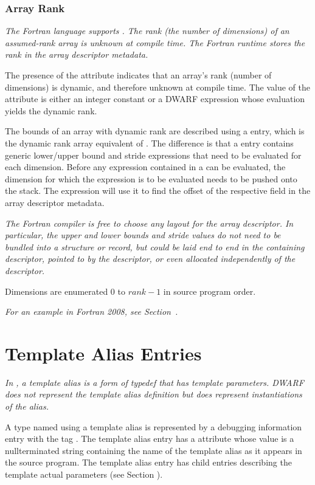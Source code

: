 \subsubsection{Array Rank}
\label{chap:DWATrank}
\textit{The Fortran language supports . The
  rank (the number of dimensions) of an assumed-rank array is unknown
  at compile time. The Fortran runtime stores the rank in the array
  descriptor metadata.}

The presence of the
\hypertarget{chap:DWATrankofdynamicarray}{\DWATrankINDX}
attribute indicates that an array's rank
(number of dimensions) is dynamic, and therefore unknown at compile
time. The value of the \DWATrankNAME{} attribute is either an integer constant
or a DWARF expression whose evaluation yields the dynamic rank.

The bounds of an array with dynamic rank are described using a
\DWTAGgenericsubrange{} entry, which  
is the dynamic rank array equivalent of
\DWTAGsubrangetype. The
difference is that a \DWTAGgenericsubrange{} entry contains generic
lower/upper bound and stride expressions that need to be evaluated for
each dimension. Before any expression contained in a
\DWTAGgenericsubrange{} can be evaluated, the dimension for which the
expression is to be evaluated needs to be pushed onto the stack. The
expression will use it to find the offset of the respective field in
the array descriptor metadata.

\textit{The Fortran compiler is free to choose any layout for the
  array descriptor. In particular, the upper and lower bounds and
  stride values do not need to be bundled into a structure or record,
  but could be laid end to end in the containing descriptor, pointed
  to by the descriptor, or even allocated independently of the
  descriptor.}

Dimensions are enumerated $0$ to $\mathit{rank}-1$ in source program
order.

\textit{For an example in Fortran 2008, see
  Section~.}

\section{Template Alias Entries}
\label{chap:templatealiasentries}

\textit{
In , a template alias is a form of typedef that has template
parameters.  DWARF does not represent the template alias definition
but does represent instantiations of the alias.
}

A type named using a template alias is represented
by a debugging information entry 
with the tag
\DWTAGtemplatealiasTARG. 
The template alias entry has a
\DWATname{} attribute 
whose value is a null\dash terminated string
containing the name of the template alias as it appears in
the source program.
The template alias entry has child entries describing the template
actual parameters (see Section ).

